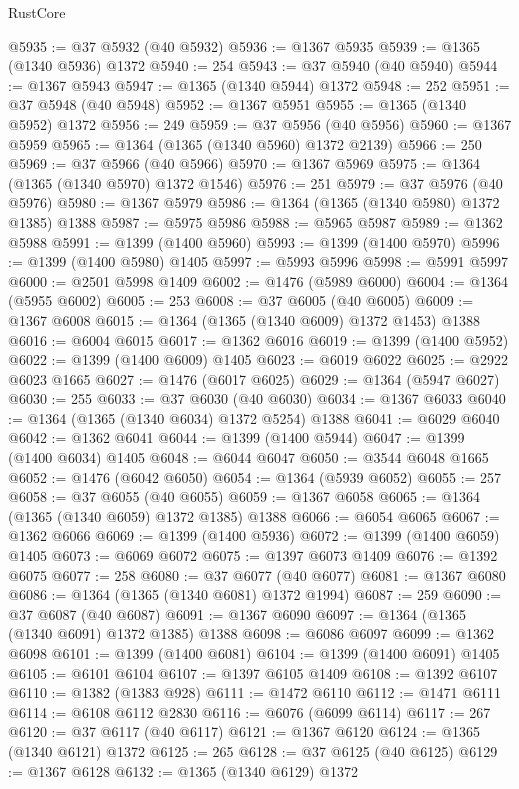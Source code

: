 \begin{lexlean}{RustCore}
\begin{coremodule}
@5935 := @37 @5932 (@40 @5932)
@5936 := @1367 @5935
@5939 := @1365 (@1340 @5936) @1372
@5940 := 254
@5943 := @37 @5940 (@40 @5940)
@5944 := @1367 @5943
@5947 := @1365 (@1340 @5944) @1372
@5948 := 252
@5951 := @37 @5948 (@40 @5948)
@5952 := @1367 @5951
@5955 := @1365 (@1340 @5952) @1372
@5956 := 249
@5959 := @37 @5956 (@40 @5956)
@5960 := @1367 @5959
@5965 := @1364 (@1365 (@1340 @5960) @1372 @2139)
@5966 := 250
@5969 := @37 @5966 (@40 @5966)
@5970 := @1367 @5969
@5975 := @1364 (@1365 (@1340 @5970) @1372 @1546)
@5976 := 251
@5979 := @37 @5976 (@40 @5976)
@5980 := @1367 @5979
@5986 := @1364 (@1365 (@1340 @5980) @1372 @1385) @1388
@5987 := @5975 @5986
@5988 := @5965 @5987
@5989 := @1362 @5988
@5991 := @1399 (@1400 @5960)
@5993 := @1399 (@1400 @5970)
@5996 := @1399 (@1400 @5980) @1405
@5997 := @5993 @5996
@5998 := @5991 @5997
@6000 := @2501 @5998 @1409
@6002 := @1476 (@5989 @6000)
@6004 := @1364 (@5955 @6002)
@6005 := 253
@6008 := @37 @6005 (@40 @6005)
@6009 := @1367 @6008
@6015 := @1364 (@1365 (@1340 @6009) @1372 @1453) @1388
@6016 := @6004 @6015
@6017 := @1362 @6016
@6019 := @1399 (@1400 @5952)
@6022 := @1399 (@1400 @6009) @1405
@6023 := @6019 @6022
@6025 := @2922 @6023 @1665
@6027 := @1476 (@6017 @6025)
@6029 := @1364 (@5947 @6027)
@6030 := 255
@6033 := @37 @6030 (@40 @6030)
@6034 := @1367 @6033
@6040 := @1364 (@1365 (@1340 @6034) @1372 @5254) @1388
@6041 := @6029 @6040
@6042 := @1362 @6041
@6044 := @1399 (@1400 @5944)
@6047 := @1399 (@1400 @6034) @1405
@6048 := @6044 @6047
@6050 := @3544 @6048 @1665
@6052 := @1476 (@6042 @6050)
@6054 := @1364 (@5939 @6052)
@6055 := 257
@6058 := @37 @6055 (@40 @6055)
@6059 := @1367 @6058
@6065 := @1364 (@1365 (@1340 @6059) @1372 @1385) @1388
@6066 := @6054 @6065
@6067 := @1362 @6066
@6069 := @1399 (@1400 @5936)
@6072 := @1399 (@1400 @6059) @1405
@6073 := @6069 @6072
@6075 := @1397 @6073 @1409
@6076 := @1392 @6075
@6077 := 258
@6080 := @37 @6077 (@40 @6077)
@6081 := @1367 @6080
@6086 := @1364 (@1365 (@1340 @6081) @1372 @1994)
@6087 := 259
@6090 := @37 @6087 (@40 @6087)
@6091 := @1367 @6090
@6097 := @1364 (@1365 (@1340 @6091) @1372 @1385) @1388
@6098 := @6086 @6097
@6099 := @1362 @6098
@6101 := @1399 (@1400 @6081)
@6104 := @1399 (@1400 @6091) @1405
@6105 := @6101 @6104
@6107 := @1397 @6105 @1409
@6108 := @1392 @6107
@6110 := @1382 (@1383 @928)
@6111 := @1472 @6110
@6112 := @1471 @6111
@6114 := @6108 @6112 @2830
@6116 := @6076 (@6099 @6114)
@6117 := 267
@6120 := @37 @6117 (@40 @6117)
@6121 := @1367 @6120
@6124 := @1365 (@1340 @6121) @1372
@6125 := 265
@6128 := @37 @6125 (@40 @6125)
@6129 := @1367 @6128
@6132 := @1365 (@1340 @6129) @1372

\end{coremodule}
\end{lexlean}
